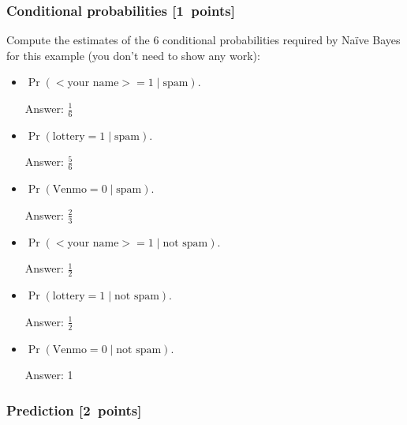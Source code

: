 \documentclass{article}
\newcommand{\blu}[1]{{\textcolor{blu}{#1}}}
\newenvironment{answer}{\par\begingroup\color{gre}Answer: }{\endgroup}
\let\ask\blu
\newcommand\pts[1]{\textcolor{pointscolour}{[#1~points]}}
\begin{document}
    \subsubsection{Conditional probabilities \pts{1}}

    \ask{Compute the estimates of the 6 conditional probabilities required by Na\"ive Bayes for this example}  (you don't need to show any work):
    \begin{itemize}
        \item $\Pr(\text{$<$your name$>$} = 1  \mid \text{spam})$.
        \begin{answer}
            $\frac{1}{6}$
        \end{answer}
    
        \item $\Pr(\text{lottery} = 1 \mid \text{spam})$.
        \begin{answer}
            $\frac{5}{6}$
        \end{answer}
        \item $\Pr(\text{Venmo} = 0  \mid \text{spam})$.
        \begin{answer}
            $\frac{2}{3}$
        \end{answer}
        \item $\Pr(\text{$<$your name$>$} = 1  \mid \text{not spam})$.
        \begin{answer}
            $\frac{1}{2}$
        \end{answer}
        \item $\Pr(\text{lottery} = 1  \mid \text{not spam})$.
        \begin{answer}
            $\frac{1}{2}$
        \end{answer}
        \item $\Pr(\text{Venmo} = 0  \mid \text{not spam})$.
        \begin{answer}
            1
        \end{answer}
    \end{itemize}

    \subsubsection{Prediction \pts{2}}
\end{document}
